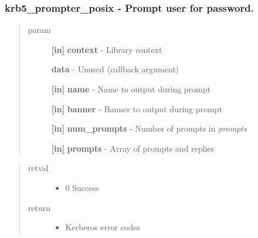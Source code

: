 \documentclass[letterpaper,10pt,english]{sphinxmanual}
\begin{document}
\subsubsection{krb5\_prompter\_posix -  Prompt user for password.}
\label{appdev/refs/api/krb5_prompter_posix:krb5-prompter-posix-prompt-user-for-password}\label{appdev/refs/api/krb5_prompter_posix::doc}

\begin{fulllineitems}
\label{appdev/refs/api/krb5_prompter_posix:krb5_prompter_posix}
\end{fulllineitems}

\begin{quote}\begin{description}
\item[{param}] \leavevmode
\textbf{{[}in{]}} \textbf{context} - Library context

\textbf{data} - Unused (callback argument)

\textbf{{[}in{]}} \textbf{name} - Name to output during prompt

\textbf{{[}in{]}} \textbf{banner} - Banner to output during prompt

\textbf{{[}in{]}} \textbf{num\_prompts} - Number of prompts in \emph{prompts}

\textbf{{[}in{]}} \textbf{prompts} - Array of prompts and replies

\end{description}\end{quote}
\begin{quote}\begin{description}
\item[{retval}] \leavevmode\begin{itemize}
\item {} 
0   Success

\end{itemize}

\item[{return}] \leavevmode\begin{itemize}
\item {} 
Kerberos error codes

\end{itemize}

\end{description}\end{quote}
\end{document}
